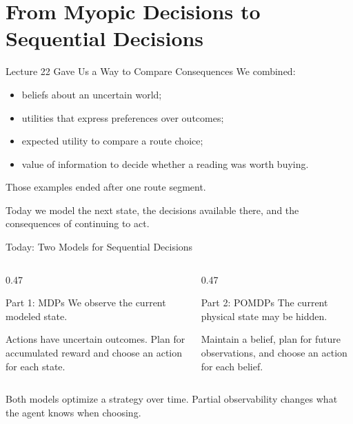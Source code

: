 \documentclass[aspectratio=169,10pt]{beamer}
\begin{document}

\makedecktitle

\section{From Myopic Decisions to Sequential Decisions}

\begin{frame}{Lecture 22 Gave Us a Way to Compare Consequences}
  We combined:
  \begin{itemize}
    \item beliefs about an uncertain world;
    \item utilities that express preferences over outcomes;
    \item expected utility to compare a route choice;
    \item value of information to decide whether a reading was worth buying.
  \end{itemize}
  Those examples ended after one route segment.
  \begin{keyidea}
    Today we model the next state, the decisions available there, and the consequences of continuing to act.
  \end{keyidea}
\end{frame}

\begin{frame}{Today: Two Models for Sequential Decisions}
  \begin{columns}[T,onlytextwidth]
    \begin{column}{0.47\textwidth}
      \begin{block}{Part 1: MDPs}
        We observe the current modeled state.

        Actions have uncertain outcomes. Plan for accumulated reward and choose an action for each state.
      \end{block}
    \end{column}
    \begin{column}{0.47\textwidth}
      \begin{block}{Part 2: POMDPs}
        The current physical state may be hidden.

        Maintain a belief, plan for future observations, and choose an action for each belief.
      \end{block}
    \end{column}
  \end{columns}
  \begin{keyidea}
    Both models optimize a strategy over time. Partial observability changes what the agent knows when choosing.
  \end{keyidea}
\end{frame}
\end{document}
